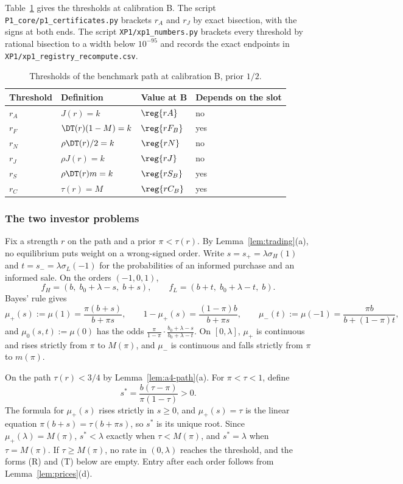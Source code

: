 Table~\ref{tab:a4-thresholds} gives the thresholds at calibration B. The script
\nolinkurl{P1_core/p1_certificates.py} brackets \(r_A\) and \(r_J\) by
exact bisection, with the signs at both ends. The script
\nolinkurl{XP1/xp1_numbers.py} brackets every threshold by rational
bisection to a width below \(10^{-95}\) and records the exact endpoints in
\nolinkurl{XP1/xp1_registry_recompute.csv}.

\begin{table}[ht]
\centering
\caption{Thresholds of the benchmark path at calibration B, prior \(1/2\).}\label{tab:a4-thresholds}
\small
\begin{tabular}{@{}llll@{}}
\toprule
Threshold & Definition & Value at B & Depends on the slot\\
\midrule
\(r_A\) & \(J(r)=k\) & \(\reg{rA}\) & no\\
\(r_F\) & \(\DT(r)(1-M)=k\) & \(\reg{rF_B}\) & yes\\
\(r_N\) & \(\rho\DT(r)/2=k\) & \(\reg{rN}\) & no\\
\(r_J\) & \(\rho J(r)=k\) & \(\reg{rJ}\) & no\\
\(r_S\) & \(\rho\DT(r)m=k\) & \(\reg{rS_B}\) & yes\\
\(r_C\) & \(\tau(r)=M\) & \(\reg{rC_B}\) & yes\\
\bottomrule
\end{tabular}
\end{table}

\subsubsection*{The two investor problems}

Fix a strength \(r\) on the path and a prior \(\pi<\tau(r)\). By Lemma~\ref{lem:trading}(a), no equilibrium puts
weight on a wrong-signed order. Write \(s=s_+=\lambda\sigma_H(1)\) and \(t=s_-=\lambda\sigma_L(-1)\) for the
probabilities of an informed purchase and an informed sale. On the orders \((-1,0,1)\),
\[
f_H=(b,\;b_0+\lambda-s,\;b+s),\qquad f_L=(b+t,\;b_0+\lambda-t,\;b).
\]
Bayes' rule gives
\[
\mu_+(s):=\mu(1)=\frac{\pi(b+s)}{b+\pi s},\qquad 1-\mu_+(s)=\frac{(1-\pi)b}{b+\pi s},\qquad
\mu_-(t):=\mu(-1)=\frac{\pi b}{b+(1-\pi)t},
\]
and \(\mu_0(s,t):=\mu(0)\) has the odds \(\frac{\pi}{1-\pi}\cdot\frac{b_0+\lambda-s}{b_0+\lambda-t}\). On
\([0,\lambda]\), \(\mu_+\) is continuous and rises strictly from \(\pi\) to \(M(\pi)\), and \(\mu_-\) is continuous
and falls strictly from \(\pi\) to \(m(\pi)\).

On the path \(\tau(r)<3/4\) by Lemma~\ref{lem:a4-path}(a). For
\(\pi<\tau<1\), define
\[
s^*=\frac{b(\tau-\pi)}{\pi(1-\tau)}>0 .
\]
The formula for \(\mu_+(s)\) rises strictly in \(s\ge0\), and \(\mu_+(s)=\tau\) is the linear equation
\(\pi(b+s)=\tau(b+\pi s)\), so \(s^*\) is its unique root. Since \(\mu_+(\lambda)=M(\pi)\), \(s^*<\lambda\) exactly when
\(\tau<M(\pi)\), and \(s^*=\lambda\) when \(\tau=M(\pi)\). If \(\tau\ge M(\pi)\), no rate in \((0,\lambda)\) reaches the
threshold, and the forms (R) and (T) below are empty. Entry after each order follows from Lemma~\ref{lem:prices}(d).

